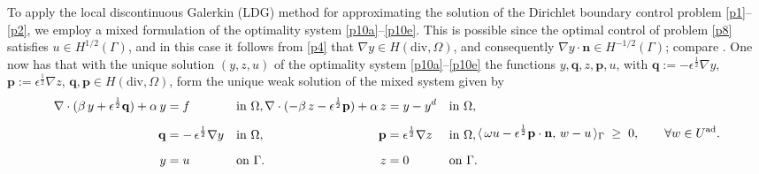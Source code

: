 \documentclass[a4paper,10pt]{article}
\newcommand{\Uad}{{U^{\textup{ad}}}}
\newcommand{\hF}{{\frac{1}{2}}}
\newcommand{\bq}{{\mathbf{q}}}
\newcommand{\bp}{{\mathbf{p}}}
\newcommand{\bn}{{\mathbf{n}}}
\numberwithin{theorem}{section}
\begin{document}
To apply the local discontinuous Galerkin (LDG) method for approximating the solution of the Dirichlet boundary control problem \eqref{p1}--\eqref{p2}, we employ a mixed formulation of the optimality system \eqref{p10a}--\eqref{p10e}. This is possible since the optimal control of problem \eqref{p8} satisfies $u\in H^{1/2}(\Gamma)$, and in this case it follows from \eqref{p4} that $\nabla y \in H(\mathrm{div},\Omega)$, and consequently $\nabla y\cdot \bn \in H^{-1/2}(\Gamma)$; compare \cite{WWHu_JGShen_JRSingler_YWZhang_XBZheng_2020, WGong_NYan_2011b}. One now has that with the unique solution  $(y,z,u)$ of the optimality system \eqref{p10a}--\eqref{p10e} the functions $y,\bq,z,\bp,u$, with $\bq:=-\epsilon^{\hF} \nabla y$, $\bp:= \epsilon^{\hF} \nabla z$, $\bq, \bp \in H(\mathrm{div},\Omega)$, form the unique weak solution of the mixed system given by
\begin{subequations}\label{p13}
\begin{align}\label{p13a}
\begin{aligned}
\nabla \cdot (\beta\, y + \epsilon^{\hF} \mathbf{q}) + \alpha\, y &= f 
    &&\text{in }\Omega,\\[2mm]
\mathbf{q} &= -\,\epsilon^{\hF} \nabla y
    &&\text{in }\Omega,\\[2mm]
y &= u 
    &&\text{on }\Gamma .
\end{aligned}
\end{align}
\begin{align}\label{p13b}
\begin{aligned}
\nabla \cdot (-\beta\, z - \epsilon^{\hF} \mathbf{p}) + \alpha\, z &= y - y^{d}
    &&\text{in }\Omega,\\[2mm]
\mathbf{p} &= \epsilon^{\hF} \nabla z
    &&\text{in }\Omega,\\[2mm]
z &= 0
    &&\text{on }\Gamma .
\end{aligned}
\end{align}
%
\begin{align}\label{p13c}
\langle\, \omega u - \epsilon^{\hF} \mathbf{p}\cdot \bn,\, w - u\, \rangle_{\Gamma} \;\ge\; 0,
    \qquad \forall w \in \Uad.
\end{align}
%
\end{subequations}


\end{document}
